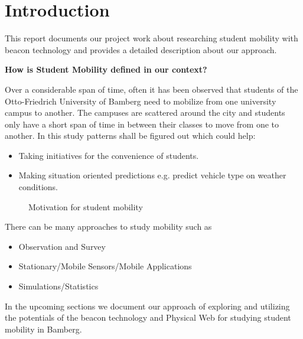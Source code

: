 \section{Introduction}
This report documents our project work about researching student mobility with beacon technology and provides a detailed description about our approach.

\textbf{How is Student Mobility defined in our context?}
\par Over a considerable span of time, often it has been observed that students of the Otto-Friedrich University of Bamberg need to mobilize from one university campus to another. The campuses are scattered around the city and students only have a short span of time in between their classes to move from one to another. In this study patterns shall be figured out which could help:
\begin{itemize}
	\item Taking initiatives for the convenience of students.
	\item Making situation oriented predictions e.g. predict vehicle type on weather conditions.
\end{itemize}
\begin{figure}[H]
	\centering
	\caption{Motivation for student mobility}
	\label{figure1:introduction_motivaton_mobility}
\end{figure}
There can be many approaches to study mobility such as
\begin{itemize}
	\item Observation and Survey
	\item Stationary/Mobile Sensors/Mobile Applications
	\item Simulations/Statistics  
\end{itemize}
In the upcoming sections we document our approach of exploring and utilizing the potentials of the beacon technology and Physical Web for studying student mobility in Bamberg.




